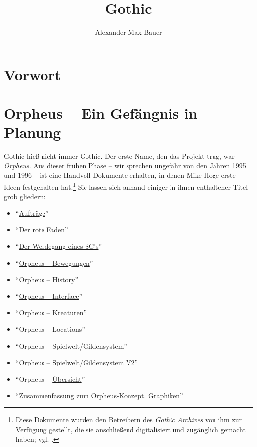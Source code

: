 \documentclass[12pt]{scrbook}
\title{Gothic}
\subtitle{}
\author{Alexander Max Bauer}
\date{}
\begin{document}
\maketitle


\frontmatter
\tableofcontents


\chapter{Vorwort}


\mainmatter
\chapter{Orpheus -- Ein Gefängnis in Planung}\label{ch:orpheus}
Gothic hieß nicht immer Gothic.
Der erste Name, den das Projekt trug, war \textit{Orpheus}.
Aus dieser frühen Phase -- wir sprechen ungefähr von den Jahren 1995 und 1996 -- ist eine Handvoll Dokumente erhalten, in denen Mike Hoge erste Ideen festgehalten hat.\footnote{Diese Dokumente wurden den Betreibern des \textit{Gothic Archives} von ihm zur Verfügung gestellt, die sie anschließend digitalisiert und zugänglich gemacht haben; vgl. \autocite{archive_orpheus}.}
Sie lassen sich anhand einiger in ihnen enthaltener Titel grob gliedern:

\begin{itemize}
   \item \enquote{\uline{Aufträge}}\autocite[S.~16--17]{orpheus_b_scribbles}
   \item \enquote{\uline{Der rote Faden}}\autocite{orpheus_der_rote}
   \item \enquote{\uline{Der Werdegang eines SC's}}\autocite{orpheus_der_werdegang}
   \item \enquote{\uline{Orpheus -- Bewegungen}}\autocite{orpheus_bewegungen}
   \item \enquote{Orpheus -- History}\autocite[S.~2--3]{orpheus_b_scribbles}
   \item \enquote{\uline{Orpheus -- Interface}}\autocite{orpheus_interface}
   \item \enquote{Orpheus -- Kreaturen}\autocite[S.~4]{orpheus_b_scribbles}
   \item \enquote{Orpheus -- Locations}\autocite[S.~5]{orpheus_b_scribbles}
   \item \enquote{Orpheus -- Spielwelt/Gildensystem}\autocite{orpheus_gildensystem}
   \item \enquote{Orpheus -- Spielwelt/Gildensystem V2}\autocite{orpheus_gildensystem_v2}
   \item \enquote{Orpheus -- \uline{Übersicht}}\autocite[S.~11--14]{orpheus_b_scribbles}
   \item \enquote{Zusammenfassung zum Orpheus-Konzept. \uline{Graphiken}}\autocite{orpheus_zusammenfassung}
\end{itemize}
\end{document}
